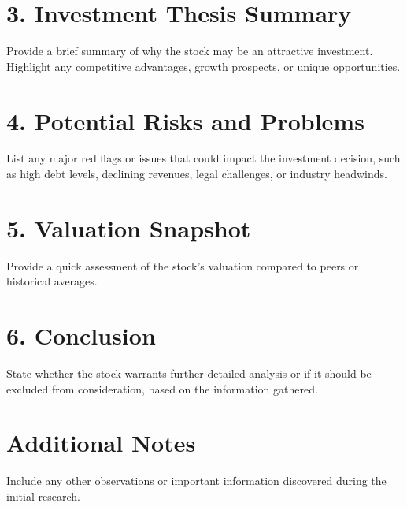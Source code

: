 \documentclass[12pt]{article}
\begin{document}
\section*{3. Investment Thesis Summary}
Provide a brief summary of why the stock may be an attractive investment. Highlight any competitive advantages, growth prospects, or unique opportunities.

\section*{4. Potential Risks and Problems}
List any major red flags or issues that could impact the investment decision, such as high debt levels, declining revenues, legal challenges, or industry headwinds.

\section*{5. Valuation Snapshot}
Provide a quick assessment of the stock's valuation compared to peers or historical averages.

\section*{6. Conclusion}
State whether the stock warrants further detailed analysis or if it should be excluded from consideration, based on the information gathered.

\section*{Additional Notes}
Include any other observations or important information discovered during the initial research.
\end{document}

